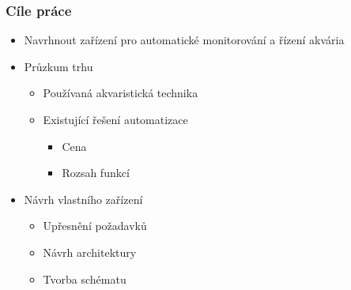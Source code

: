 \documentclass[%
  12pt,       				%
	t,                  %
	aspectratio=1610,   %
	unicode,						%
]{beamer}				    	%
\begin{document}
\disablenavigationsymbols

\maketitle

\begin{frame} 
	\frametitle{Cíle práce}
	\begin{itemize}
			\item Navrhnout zařízení pro automatické monitorování a řízení akvária
			\item Průzkum trhu
				\begin{itemize}
					\item Používaná akvaristická technika 
					\item Existující řešení automatizace
					\begin{itemize}
						\item Cena 
						\item Rozsah funkcí
					\end{itemize}
				\end{itemize}
			\item Návrh vlastního zařízení
				\begin{itemize}
					\item Upřesnění požadavků
					\item Návrh architektury
					\item Tvorba schématu
				\end{itemize}
	\end{itemize}
\end{frame}
\end{document}
